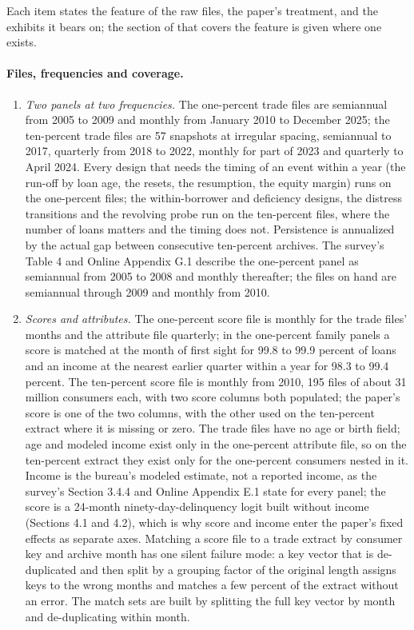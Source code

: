 Each item states the feature of the raw files, the paper's treatment, and the exhibits it bears on; the section of \citet{gibbs_consumer_2025} that covers the feature is given where one exists.

\paragraph{Files, frequencies and coverage.}

\begin{enumerate}

\item \emph{Two panels at two frequencies.} The one-percent trade files are semiannual from 2005 to 2009 and monthly from January 2010 to December 2025; the ten-percent trade files are 57 snapshots at irregular spacing, semiannual to 2017, quarterly from 2018 to 2022, monthly for part of 2023 and quarterly to April 2024. Every design that needs the timing of an event within a year (the run-off by loan age, the resets, the resumption, the equity margin) runs on the one-percent files; the within-borrower and deficiency designs, the distress transitions and the revolving probe run on the ten-percent files, where the number of loans matters and the timing does not. Persistence is annualized by the actual gap between consecutive ten-percent archives. The survey's Table 4 and Online Appendix G.1 describe the one-percent panel as semiannual from 2005 to 2008 and monthly thereafter; the files on hand are semiannual through 2009 and monthly from 2010.

\item \emph{Scores and attributes.} The one-percent score file is monthly for the trade files' months and the attribute file quarterly; in the one-percent family panels a score is matched at the month of first sight for 99.8 to 99.9 percent of loans and an income at the nearest earlier quarter within a year for 98.3 to 99.4 percent. The ten-percent score file is monthly from 2010, 195 files of about 31 million consumers each, with two score columns both populated; the paper's score is one of the two columns, with the other used on the ten-percent extract where it is missing or zero. The trade files have no age or birth field; age and modeled income exist only in the one-percent attribute file, so on the ten-percent extract they exist only for the one-percent consumers nested in it. Income is the bureau's modeled estimate, not a reported income, as the survey's Section 3.4.4 and Online Appendix E.1 state for every panel; the score is a 24-month ninety-day-delinquency logit built without income (Sections 4.1 and 4.2), which is why score and income enter the paper's fixed effects as separate axes. Matching a score file to a trade extract by consumer key and archive month has one silent failure mode: a key vector that is de-duplicated and then split by a grouping factor of the original length assigns keys to the wrong months and matches a few percent of the extract without an error. The match sets are built by splitting the full key vector by month and de-duplicating within month.


\end{enumerate}
